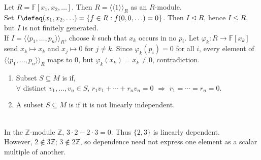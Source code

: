 \begin{example} \label{ex:finitely-generated-module-with-non-fg-submodule} \\
Let $R=\mathbb{F}[x_1,x_2,\ldots]$. Then $R=\langle\!\langle1\rangle\!\rangle_R$ as an $R$-module.\\
Set $I\defeq (x_1,x_2,\ldots)=\{f\in R:f(0,0,\ldots)=0\}$. Then $I\trianglelefteq R$, hence $I\leq R$, but $I$ is not finitely generated.\\
If $I=\langle\!\langle p_1,\ldots,p_n\rangle\!\rangle_R$, choose $k$ such that $x_k$ occurs in no $p_i$. Let $\varphi_k:R\to\mathbb{F}[x_k]$ send $x_k\mapsto x_k$ and $x_j\mapsto0$ for $j\neq k$. Since $\varphi_k(p_i)=0$ for all $i$, every element of $\langle\!\langle p_1,\ldots,p_n\rangle\!\rangle_R$ maps to $0$, but $\varphi_k(x_k)=x_k\neq0$, contradiction.
\end{example}

\begin{definition} \label{def:module-linear-independence} 
\begin{enumerate}[label=(\roman*)]
\setlength{\itemsep}{0pt}
\item Subset $S\subseteq M$ is  if,\\
$\forall$ distinct $v_1,\ldots,v_n\in S$, $r_1v_1+\cdots+r_nv_n=0$ $\Longrightarrow$ $r_1=\cdots=r_n=0$.
\item A subset $S\subseteq M$ is  if it is not linearly independent.
\end{enumerate}
\end{definition}

\begin{example} \label{ex:module-dependence-need-not-solve-for-vector} \\
In the $\mathbb{Z}$-module $\mathbb{Z}$, $3\cdot2-2\cdot3=0$. Thus $\{2,3\}$ is linearly dependent.\\
However, $2\notin 3\mathbb{Z}$; $3\notin 2\mathbb{Z}$, so dependence need not express one element as a scalar multiple of another.
\end{example}

